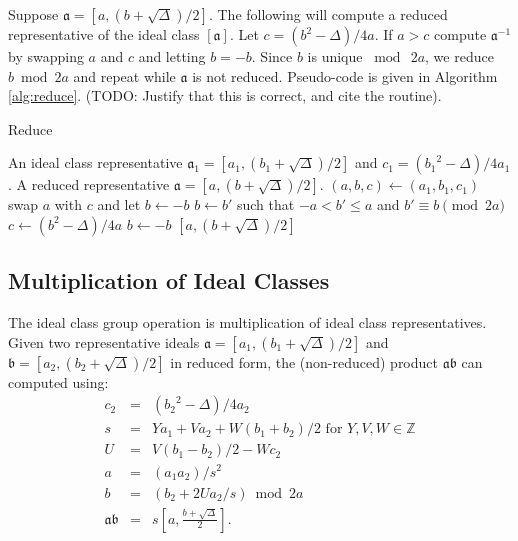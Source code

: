 \documentclass{ucalgthes1}
\theoremstyle{definition}
\newcommand{\ZZ}{\mathbb{Z}}
\begin{document}
Suppose $\mathfrak a = [a, (b + \sqrt\Delta)/2]$. The following will compute a reduced representative of the ideal class $[\mathfrak a]$.  Let $c = (b^2 - \Delta)/4a$.  If $a > c$ compute ${\mathfrak a}^{-1}$ by swapping $a$ and $c$ and letting $b = -b$.  Since $b$ is unique $\bmod{~2a}$, we reduce $b \bmod{2a}$ and repeat while $\mathfrak a$ is not reduced.  Pseudo-code is given in Algorithm \ref{alg:reduce}. (TODO: Justify that this is correct, and cite the routine).

\begin{algorithm}[h]
\caption{Reduce}
\label{alg:reduce}
\begin{algorithmic}[1]
\REQUIRE An ideal class representative $\mathfrak a_1 = [a_1, (b_1+\sqrt\Delta)/2]$ and $c_1 = ({b_1}^2 - \Delta)/4a_1$.
\ENSURE A reduced representative $\mathfrak a = [a, (b+\sqrt\Delta)/2]$.
\STATE $(a, b, c) \gets (a_1, b_1, c_1)$
		\STATE swap $a$ with $c$ and let $b \gets -b$
	\ENDIF
		\STATE $b \gets b'$ such that $-a < b' \le a$ and $b' \equiv b \pmod{2a}$
		\STATE $c \gets (b^2-\Delta)/4a$
	\ENDIF
\ENDWHILE
{}
	\STATE $b \gets -b$
\ENDIF
\RETURN $[a, (b+\sqrt\Delta)/2]$
\end{algorithmic}
\end{algorithm}



\subsection{Multiplication of Ideal Classes}
\label{subsec:idealMultiply}

The ideal class group operation is multiplication of ideal class representatives. Given two representative ideals $\mathfrak a = [a_1, (b_1 + \sqrt{\Delta})/2]$ and $\mathfrak b = [a_2, (b_2 + \sqrt{\Delta})/2]$ in reduced form, the (non-reduced) product $\mathfrak a \mathfrak b$ can computed using:
\begin{eqnarray}
	c_2 & = & ({b_2}^2-\Delta)/4a_2 \\
	s & = & Ya_1 + Va_2 + W(b_1+b_2)/2 \textrm{ for $Y, V, W \in \ZZ$}  \label{eq:idealProductS} \\
	U & = & V(b_1-b_2)/2 - Wc_2                                         \label{eq:idealProductU} \\
	a & = & (a_1a_2)/s^2                                                \label{eq:idealProductA} \\
	b & = & (b_2 + 2Ua_2/s) \bmod{2a}                                   \label{eq:idealProductB} \\
	\mathfrak a \mathfrak b & = & s\left[a, \frac{b + \sqrt{\Delta}}{2}\right].
\end{eqnarray}
\end{document}
